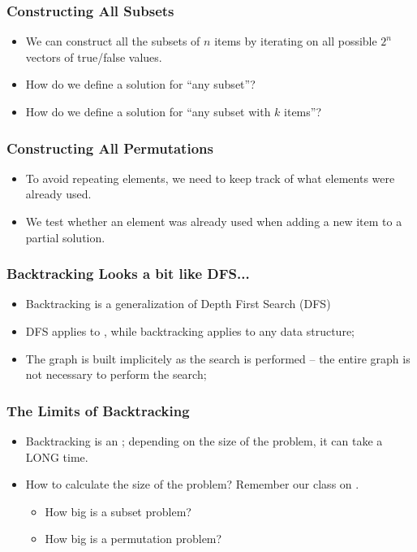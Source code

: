 \documentclass{beamer}
\begin{document}
\begin{frame}
  \frametitle{Constructing All Subsets}
  \begin{itemize}
  \item We can construct all the subsets of $n$ items by iterating on
    all possible $2^n$ vectors of true/false values.
  \item How do we define a solution for ``any subset''?
  \item How do we define a solution for ``any subset with $k$ items''?
  \end{itemize}
\end{frame}

\begin{frame}
  \frametitle{Constructing All Permutations}
  \begin{itemize}
  \item To avoid repeating elements, we need to keep track of what
    elements were already used.
  \item We test whether an element was already used when adding a new
    item to a partial solution.
  \end{itemize}
\end{frame}

\begin{frame}
  \frametitle{Backtracking Looks a bit like DFS...}

  \begin{itemize}
  \item Backtracking is a generalization of Depth First Search (DFS)
  \item DFS applies to , while backtracking
    applies to any data structure;
  \item The graph is built implicitely as the search is performed --
    the entire graph is not necessary to perform the search;
  \end{itemize}
\end{frame}

\begin{frame}
  \frametitle{The Limits of Backtracking}
  \begin{itemize}
  \item Backtracking is an ; depending on
    the size of the problem, it can take a LONG time.
  \item How to calculate the size of the problem? Remember our class
    on .
    \begin{itemize}
    \item How big is a subset problem?
    \item How big is a permutation problem?
    \end{itemize}
  \end{itemize}
\end{frame}
\end{document}
